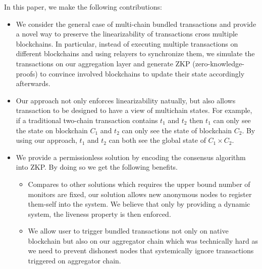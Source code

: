 In this paper, we make the following contributions:
\begin{itemize}
\item We consider the general case of multi-chain bundled transactions and provide a novel way to preserve the linearizability of transactions cross multiple blockchains. In particular, instead of executing multiple transactions on different blockchains and using relayers to synchronize them, we simulate the transactions on our aggregation layer and generate ZKP (zero-knowledge-proofs) to convince involved blockchains to update their state accordingly afterwards. 

\item Our approach not only enforces linearizability natually, but also allows transaction to be designed to have a view of multichain states. For example, if a traditional two-chain transaction contains $t_1$ and $t_2$ then $t_1$ can only see the state on blockchain $C_1$ and $t_2$ can only see the state of blockchain $C_2$. By using our approach, $t_1$ and $t_2$ can both see the global state of $C_1 \times C_2$.

\item We provide a permissionless solution by encoding the consensus algorithm into ZKP. By doing so we get the following benefits.
\begin{itemize}
    \item Compares to other solutions which requires the upper bound number of monitors are fixed, our solution allows new anonymous nodes to register them-self into the system. We believe that only by providing a dynamic system, the liveness property is then enforced.
    \item We allow user to trigger bundled transactions not only on native blockchain but also on our aggregator chain which was technically hard as we need to prevent dishonest nodes that systemically ignore transactions triggered on aggregator chain.
    \end{itemize}
\end{itemize}